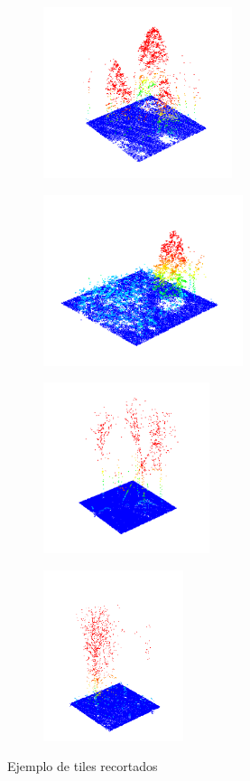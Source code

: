 \begin{figure}[h]
\centering
\begin{subfigure}[t]{.5\textwidth}
  \centering
  \includegraphics[height=5cm]{imaxes/subtile1.png}
\end{subfigure}%
\begin{subfigure}[t]{.5\textwidth}
  \centering
  \includegraphics[height=5cm]{imaxes/subtile2.png}
\end{subfigure}

\begin{subfigure}[t]{.5\textwidth}
  \centering
  \includegraphics[height=5cm]{imaxes/subtile3.png}
\end{subfigure}%
\begin{subfigure}[t]{.5\textwidth}
  \centering
  \includegraphics[height=5cm]{imaxes/subtile4.png}
\end{subfigure}

\caption{Ejemplo de tiles recortados}
\label{fig:ejemplotree}
\end{figure}

